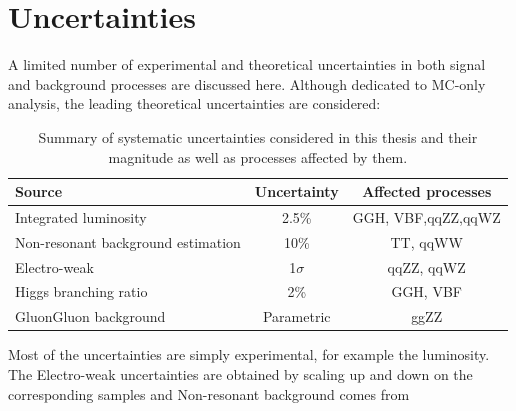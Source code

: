 \section{Uncertainties}
A limited number of experimental and theoretical uncertainties in both signal and background
processes are discussed here. Although dedicated to MC-only analysis, the leading theoretical
uncertainties are considered:
\begin{table}[hbt]
    \centering
\begin{tabular}{lcc}
\hline
Source                             & Uncertainty            & Affected processes \\ \hline
Integrated luminosity              & 2.5\%                  & GGH, VBF,qqZZ,qqWZ \\
Non-resonant background estimation & 10\%                   & TT, qqWW           \\
Electro-weak                       & 1$\sigma$ & qqZZ, qqWZ         \\
Higgs branching ratio              & 2\%                    & GGH, VBF           \\
GluonGluon background              & Parametric                   & ggZZ
\end{tabular}
\caption{Summary of systematic uncertainties considered in this thesis and their
magnitude as well as processes affected by them.}
\label{tab:systs}
\end{table}
Most of the uncertainties are simply experimental, for example the luminosity. The Electro-weak
uncertainties are obtained by scaling up and down on the corresponding samples and Non-resonant
background comes from 
